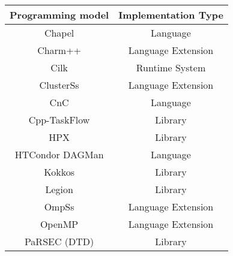 \begin{tabular}{cc}
\hline
Programming model & Implementation Type \\
\hline
Chapel & Language\\
Charm++ & Language Extension\\
Cilk & Runtime System\\
ClusterSs & Language Extension\\
CnC & Language\\
Cpp-TaskFlow & Library\\
HPX & Library\\
HTCondor DAGMan & Language\\
Kokkos & Library\\
Legion & Library\\
OmpSs & Language Extension\\
OpenMP & Language Extension\\
PaRSEC (DTD) & Library\\
\hline
\end{tabular}
